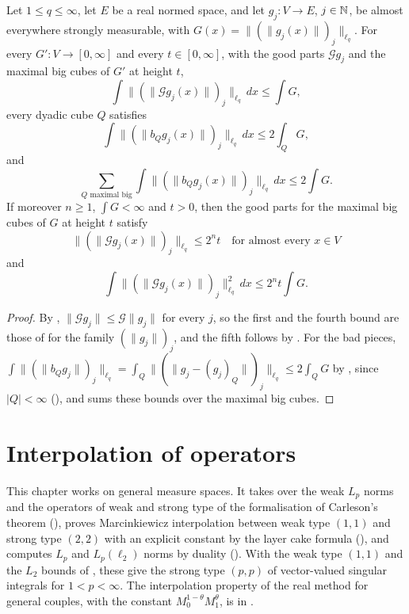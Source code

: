 \begin{theorem}
\label{thm:calderon-zygmund-signed-family}
\leanok
{}
Let $1 \leq q \leq \infty$, let $E$ be a real normed space, and let $g_j : V \to E$, $j \in \mathbb{N}$,
be almost everywhere strongly measurable, with $G(x) = \|(\|g_j(x)\|)_j\|_{\ell_q}$. For every
$G' : V \to [0, \infty]$ and every $t \in [0, \infty]$, with the good parts $\mathcal G g_j$ and
the maximal big cubes of $G'$ at height $t$,
\[
  \int \|(\|\mathcal G g_j(x)\|)_j\|_{\ell_q} \, dx \leq \int G ,
\]
every dyadic cube $Q$ satisfies
\[
  \int \|(\|b_Q g_j(x)\|)_j\|_{\ell_q} \, dx \leq 2 \int_Q G ,
\]
and
\[
  \sum_{Q \text{ maximal big}} \int \|(\|b_Q g_j(x)\|)_j\|_{\ell_q} \, dx \leq 2 \int G .
\]
If moreover $n \geq 1$, $\int G < \infty$ and $t > 0$, then the good parts for the maximal big
cubes of $G$ at height $t$ satisfy
\[
  \|(\|\mathcal G g_j(x)\|)_j\|_{\ell_q} \leq 2^n t \quad \text{for almost every } x \in V
\]
and
\[
  \int \|(\|\mathcal G g_j(x)\|)_j\|_{\ell_q}^2 \, dx \leq 2^n t \int G .
\]
\end{theorem}

\begin{proof}
\leanok
By , $\|\mathcal G g_j\| \leq \mathcal G \|g_j\|$ for
every $j$, so the first and the fourth bound are those of
 for the family $(\|g_j\|)_j$, and the fifth follows by
. For the bad pieces,
$\int \|(\|b_Q g_j\|)_j\|_{\ell_q} = \int_Q \|(\|g_j - (g_j)_Q\|)_j\|_{\ell_q} \leq 2 \int_Q G$
by , since $|Q| < \infty$ (), and
 sums these bounds over the maximal big cubes.
\end{proof}

\chapter{Interpolation of operators}
\label{ch:operator-interpolation}

This chapter works on general measure spaces. It takes over the weak $L_p$ norms and the operators
of weak and strong type of the formalisation of Carleson's theorem \cite{CarlesonLean}
(), proves Marcinkiewicz interpolation between weak type $(1,1)$
and strong type $(2,2)$ with an explicit constant by the layer cake formula
(), and computes $L_p$ and $L_p(\ell_2)$ norms by duality
(). With the weak type $(1,1)$ and the $L_2$ bounds of
, these give the strong type $(p,p)$ of vector-valued singular
integrals for $1 < p < \infty$. The interpolation property of the real method for general
couples, with the constant $M_0^{1-\theta} M_1^{\theta}$, is 
in .

